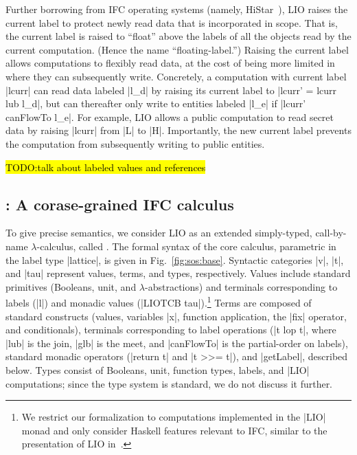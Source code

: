 Further borrowing from IFC operating systems (namely,
HiStar~\cite{zeldovich:histar}), LIO raises the current label to
protect newly read data that is incorporated in scope.
%
That is, the current label is raised to ``float'' above the labels of
all the objects read by the current computation.
(Hence the name ``floating-label.'')
% 
Raising the current label allows computations to flexibly read data,
at the cost of being more limited in where they can subsequently
write.
%
Concretely, a computation with current label |lcurr| can read data
labeled |l_d| by raising its current label to |lcurr' = lcurr lub
l_d|, but can thereafter only write to entities labeled |l_e| if
|lcurr' canFlowTo l_e|.
%
For example, LIO allows a public computation to read secret data by
raising |lcurr| from |L| to |H|. Importantly, the new current label
prevents the computation from subsequently writing to public entities.

\hl{TODO:talk about labeled values and references}
 
\subsection{\lio: A corase-grained IFC calculus}
 
To give precise semantics, we consider LIO as an extended
simply-typed, call-by-name $\lambda$-calculus, called \lio.
%
The formal syntax of the core \lio{} calculus, parametric in the label
type |lattice|, is given in Fig.~\ref{fig:sos:base}.
%
Syntactic categories |v|, |t|, and |tau| represent values, terms, and
types, respectively.
%
Values include standard primitives (Booleans, unit,
and $\lambda$-abstractions) and terminals corresponding to labels
(|l|) and monadic values (|LIOTCB tau|).\footnote{
We restrict our formalization to computations implemented in the |LIO|
monad and only consider Haskell features relevant to IFC, similar to
the presentation of LIO in~\cite{stefan:lio,stefan:addressing-covert}.
}
%
Terms are composed of standard constructs (values, variables |x|,
function application, the |fix| operator, and conditionals), terminals
corresponding to label operations (|t lop t|, where |lub| is the join,
|glb| is the meet, and |canFlowTo| is the partial-order on labels),
standard monadic operators (|return t| and |t >>= t|), and |getLabel|,
described below.
%
Types consist of Booleans, unit, function types, labels, and |LIO|
computations; since the \lio{} type system is standard, we do not
discuss it further.


